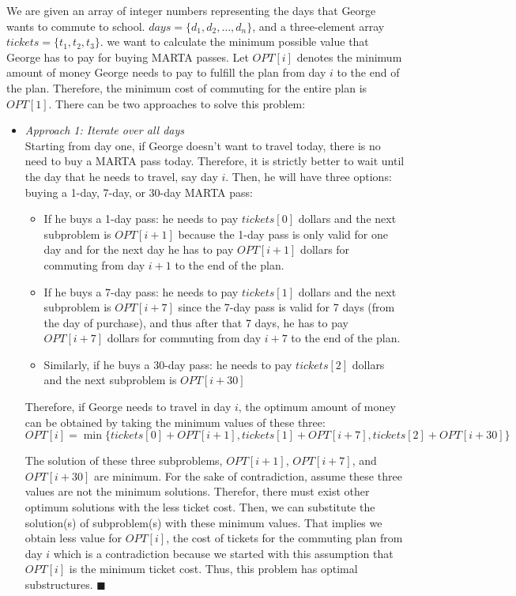 \documentclass{article}
\begin{document}
We are given an array of integer numbers representing the days that George wants to commute to school. $days = \{d_1, d_2, \ldots, d_n \}$, and a three-element array $tickets = \{t_1, t_2, t_3\}$. we want to calculate the minimum possible value that George has to pay for buying MARTA passes. Let $OPT[i]$ denotes the minimum amount of money George needs to pay to fulfill the plan from day $i$ to the end of the plan. Therefore, the minimum cost of commuting for the entire plan is $OPT[1]$.
There can be two approaches to solve this problem: \\
\begin{itemize}
\item\textit{Approach 1: Iterate over all days}\\
Starting from day one, if George doesn't want to travel today, there is no need to buy a MARTA pass today. Therefore, it is strictly better to wait until the day that he needs to travel, say day $i$. Then, he will have three options: buying a 1-day, 7-day, or 30-day MARTA pass:
\begin{itemize}
	\item If he buys a 1-day pass: he needs to pay $tickets[0]$ dollars and the next subproblem is $OPT[i+1]$ because the 1-day pass is only valid for one day and for the next day he has to pay $OPT[i+1]$ dollars for commuting from day $i+1$ to the end of the plan.
	\item If he buys a 7-day pass: he needs to pay $tickets[1]$ dollars and the next subproblem is $OPT[i+7]$ since the 7-day pass is valid for 7 days (from the day of purchase), and thus after that 7 days, he has to pay $OPT[i+7]$ dollars for commuting from day $i+7$ to the end of the plan.
	\item Similarly, if he buys a 30-day pass: he needs to pay $tickets[2]$ dollars and the next subproblem is $OPT[i+30]$
\end{itemize}

Therefore, if George needs to travel in day $i$, the optimum amount of money can be obtained by taking the minimum values of these three:
$$
OPT[i] = \min\{ tickets[0] + OPT[i+1], tickets[1] + OPT[i+7] ,  tickets[2] + OPT[i+30]\}
$$


The solution of these three subproblems, $OPT[i+1]$, $OPT[i+7]$, and $OPT[i+30]$ are minimum. For the sake of contradiction, assume these three values are not the minimum solutions. Therefor, there must exist other optimum solutions with the less ticket cost. Then, we can substitute the solution(s) of subproblem(s) with these minimum values. That implies we obtain less value for $OPT[i]$, the cost of tickets for the commuting plan from day $i$ which is a contradiction because we started with this assumption that $OPT[i]$ is the minimum ticket cost. Thus, this problem has optimal substructures. $\blacksquare$


\end{itemize}
\end{document}
